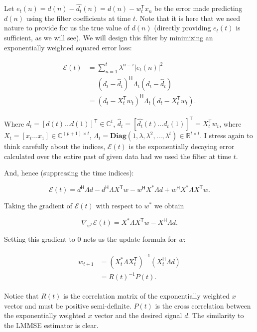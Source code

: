 \documentclass[a4paper, 12pt]{article}
\def\T{\mathsf{T}}
\def\H{\mathsf{H}}
\begin{document}
Let $e_t(n) = d(n) - \hat{d_t}(n) = d(n) - w_t^\T x_n$ be the error made predicting $d(n)$ using the filter coefficients at time $t$.  Note that it is here that we need nature to provide for us the true value of $d(n)$ (directly providing $e_t(t)$ is sufficient, as we will see).  We will design this filter by minimizing an exponentially weighted squared error loss:

\begin{align}
\begin{split}
\label{eq:loss}
  \mathcal{E}(t) &= \sum_{n = 1}^{t}\lambda^{n - \tau}|e_t(n)|^2 \\
  &= (d_t - \hat{d}_t)^\H \Lambda_t (d_t - \hat{d}_t) \\
  &= (d_t - X_t^\T w_t)^\H \Lambda_t (d_t - X_t^\T w_t).
\end{split}
\end{align}

Where $d_t = [d(t) \ldots d(1)]^\T \in \mathbb{C}^t$, $\hat{d}_t = [\hat{d_t}(t) \ldots \hat{d_t}(1)]^\T = X_t^\T w_t$, where $X_t = [x_t \ldots x_1] \in \mathbb{C}^{(p + 1) \times t}$, $\Lambda_t = \textbf{Diag}(1, \lambda, \lambda^2, \ldots, \lambda^t) \in \mathbb{R}^{t \times t}$.  I stress again to think carefully about the indices, $\mathcal{E}(t)$ is the exponentially decaying error calculated over the entire past of given data had we used the filter at time $t$.

And, hence (suppressing the time indices):

$$
\mathcal{E}(t) = d^\H \Lambda d - d^\H\Lambda X^\T w - w^\H X^* \Lambda d + w^\H X^* \Lambda X^\T w.
$$

Taking the gradient of $\mathcal{E}(t)$ with respect to $w^*$ we obtain

$$
\nabla_{w^*}\mathcal{E}(t) = X^* \Lambda X^\T w - X^\H \Lambda d.
$$

Setting this gradient to $0$ nets us the update formula for $w$:

\begin{align}
\begin{split}
\label{eq:w_update}
  w_{t + 1} &= (X_t^* \Lambda X_t^\T)^{-1}(X_t^\H \Lambda d) \\
  &= R(t)^{-1}P(t).
\end{split}
\end{align}

Notice that $R(t)$ is the correlation matrix of the exponentially weighted $x$ vector and must be positive semi-definite.  $P(t)$ is the cross correlation between the exponentially weighted $x$ vector and the desired signal $d$.  The similarity to the LMMSE estimator is clear.
\end{document}

